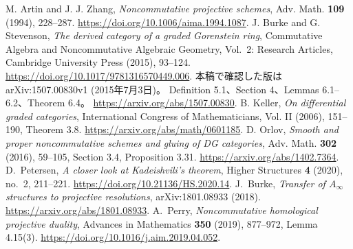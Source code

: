  M. Artin and J. J. Zhang,
\emph{Noncommutative projective schemes}, Adv. Math. \textbf{109} (1994), 228--287.
\url{https://doi.org/10.1006/aima.1994.1087}.
 J. Burke and G. Stevenson,
\emph{The derived category of a graded Gorenstein ring},
Commutative Algebra and Noncommutative Algebraic Geometry, Vol.~2: Research Articles,
Cambridge University Press (2015), 93--124.
\url{https://doi.org/10.1017/9781316570449.006}.
本稿で確認した版はarXiv:1507.00830v1 (2015年7月3日)。
Definition 5.1、Section 4、Lemmas 6.1--6.2、Theorem 6.4。
\url{https://arxiv.org/abs/1507.00830}.
 B. Keller, \emph{On differential graded categories},
International Congress of Mathematicians, Vol. II (2006), 151--190, Theorem 3.8.
\url{https://arxiv.org/abs/math/0601185}.
 D. Orlov,
\emph{Smooth and proper noncommutative schemes and gluing of DG categories},
Adv. Math. \textbf{302} (2016), 59--105, Section 3.4, Proposition 3.31.
\url{https://arxiv.org/abs/1402.7364}.
 D.~Petersen,
\emph{A closer look at Kadeishvili's theorem},
Higher Structures \textbf{4} (2020), no.~2, 211--221.
\url{https://doi.org/10.21136/HS.2020.14}.
 J.~Burke,
\emph{Transfer of $A_\infty$ structures to projective resolutions},
arXiv:1801.08933 (2018).
\url{https://arxiv.org/abs/1801.08933}.
 A.~Perry,
\emph{Noncommutative homological projective duality},
Advances in Mathematics \textbf{350} (2019), 877--972,
Lemma 4.15(3).
\url{https://doi.org/10.1016/j.aim.2019.04.052}.
